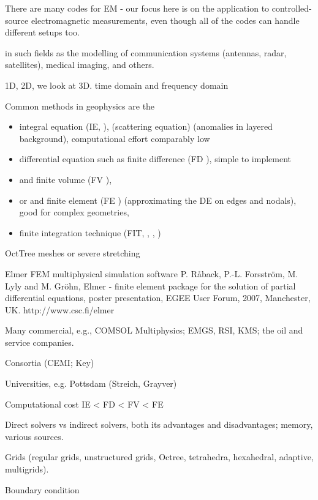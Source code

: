 \documentclass[
    paper,
  ]{geophysics}
\begin{document}
There are many codes for EM - our focus here is on the application to
controlled-source electromagnetic measurements, even though all of the codes
can handle different setups too.

in such fields as the modelling of communication systems (antennas, radar,
satellites), medical imaging, and others.

1D, 2D, we look at 3D.
time domain and frequency domain


Common methods in geophysics are the

\begin{itemize}
  \item integral equation (IE, \cite{GJI.74.Raiche, GEO.06.Zhdanov,
    CAG.16.Kruglyakov}), (scattering equation) (anomalies in layered
    background), computational effort comparably low
  \item differential equation such as finite difference (FD \cite{IEEE.66.Yee,
    GEO.93.Wang}), simple to implement
  \item and finite volume (FV \cite{EM.90.Madsen, GEO.14.Jahandari}),
  \item or and finite element (FE \cite{GEO.04.Commer GEO.09.Streich})
    (approximating the DE on edges and nodals), good for complex geometries,
  \item finite integration technique (FIT, \cite{AEU.77.Weiland},
    \cite{PIER.01.Clemens}, \cite{GP.06.Mulder})
\end{itemize}

OctTree meshes or severe stretching \citep{ECP.07.Haber}


Elmer FEM multiphysical simulation software P. Råback, P.-L. Forsström, M. Lyly
and M. Gröhn, Elmer - finite element package for the solution of partial
differential equations, poster presentation, EGEE User Forum, 2007, Manchester,
UK. http://www.csc.fi/elmer


Many commercial, e.g., COMSOL Multiphysics; EMGS, RSI, KMS; the oil and service
companies.

Consortia (CEMI; Key)

Universities, e.g. Pottsdam (Streich, Grayver)

Computational cost IE < FD < FV < FE

Direct solvers vs indirect solvers, both its advantages and disadvantages;
memory, various sources.

Grids (regular grids, unstructured grids, Octree, tetrahedra, hexahedral,
adaptive, multigrids).

Boundary condition
\end{document}
